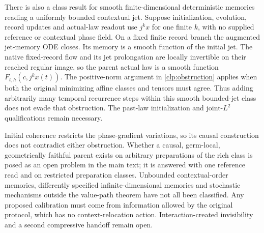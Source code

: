There is also a class result for smooth finite-dimensional deterministic memories reading a uniformly bounded contextual jet. Suppose initialization, evolution, record updates and actual-law readout use $j^k x$ for one finite $k$, with no supplied reference or contextual phase field. On a fixed finite record branch the augmented jet-memory ODE closes. Its memory is a smooth function of the initial jet. The native fixed-record flow and its jet prolongation are locally invertible on their reached regular image, so the parent actual law is a smooth function $F_{t,h}(c,j^k x(t))$. The positive-norm argument in \cref{clp:obstruction} applies when both the original minimizing affine classes and tensors must agree. Thus adding arbitrarily many temporal recurrence steps within this smooth bounded-jet class does not evade that obstruction. The past-law initialization and joint-$L^2$ qualifications remain necessary.

Initial coherence restricts the phase-gradient variations, so its causal construction does not contradict either obstruction. Whether a causal, germ-local, geometrically faithful parent exists on arbitrary preparations of the rich class is posed as an open problem in the main text; it is answered with one reference read and on restricted preparation classes. Unbounded contextual-order memories, differently specified infinite-dimensional memories and stochastic mechanisms outside the value-path theorem have not all been classified. Any proposed calibration must come from information allowed by the original protocol, which has no context-relocation action. Interaction-created invisibility and a second compressive handoff remain open.
